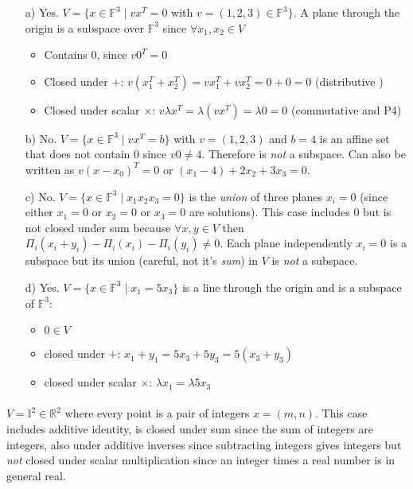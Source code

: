 \documentclass[11pt,notitlepage,oneside]{article}
\newcommand{\exo}[1]{%
\addtocontents{toc}{\protect\setcounter{tocdepth}{2}}%
\paragraph{#1}}
\begin{document}
\begin{enumerate}
\item[a)] Yes. $V=\{x\in\mathbb{F}^3\mid vx^T=0$ with $v=(1,2,3)\in \mathbb{F}^3 \}$. A plane through the origin is a subspace over $\mathbb{F}^3$ since $\forall x_1, x_2 \in V$
\begin{itemize}
\item Contains $0$, since $v0^T= 0$
\item Closed under $+$: $v(x_1^T + x_2^T) = vx_1^T + vx_2^T= 0+0 = 0$ (distributive )
\item Closed under scalar $\times$: $v \lambda x^T = \lambda (v x^T) = \lambda 0 = 0$  (commutative and P4)
\end{itemize}

\item[b)] No. $V=\{x\in\mathbb{F}^3\mid vx^T=b\}$ with  $v=(1,2,3)$ and $b=4$ is an affine set that does not contain $0$ since $v0\neq 4$. Therefore is \emph{not} a subspace. Can also be written as $v(x-x_0)^T = 0$ or $(x_1-4) + 2x_2 + 3x_3=0$.

\item[c)] No.  $V=\{x\in\mathbb{F}^3\mid x_1x_2x_3=0\}$ is the \emph{union} of three planes $x_i=0$ (since either $x_1=0$ or $x_2=0$ or $x_3=0$ are solutions). 
This case includes $0$ but is not closed under sum because $\forall x,y\in V$ then $\Pi_i(x_i+y_i)-\Pi_i(x_i)-\Pi_i(y_i) \neq 0$. 
Each plane independently $x_i=0$  is a subspace but its union (careful, not it's \emph{sum}) in $V$ is \emph{not} a subspace.

\item[d)]Yes. $V=\{x\in\mathbb{F}^3\mid x_1=5x_3\}$ is a line through the origin and is a subspace of $\mathbb{F}^3$:
\begin{itemize}
\item $0\in V$
\item closed under $+$: $ x_1+y_1 = 5x_3+5y_3 = 5(x_3+y_3)$
\item closed under scalar $\times$: $\lambda x_1 = \lambda 5x_3$
\end{itemize}

\end{enumerate}
\exo{}
$V = \mathbb{I}^2 \in \mathbb{R}^2$ where every point is a pair of integers $x=(m,n)$. This case includes additive identity, is closed under sum since the sum of integers are integers, also under additive inverses since subtracting integers gives integers but \emph{not} closed under scalar multiplication since an integer times a real number is in general real.
\end{document}
